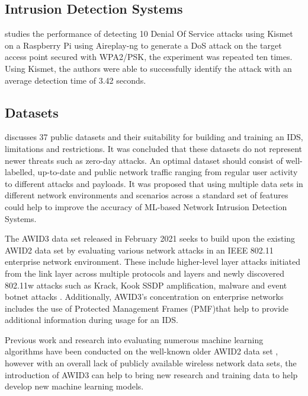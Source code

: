 \subsection{Intrusion Detection Systems}

\cite{10.4108/eai.27-11-2021.2315535} studies the performance of detecting 10 Denial Of Service attacks using Kismet on a Raspberry Pi using Aireplay-ng to generate a DoS attack on the target access point secured with WPA2/PSK, the experiment was repeated ten times. Using Kismet, the authors were able to successfully identify the attack with an average detection time of 3.42 seconds.

\subsection{Datasets}

\cite{9664737} discusses 37 public datasets and their suitability for building and training an IDS, limitations and restrictions. It was concluded that these datasets do not represent newer threats such as zero-day attacks. An optimal dataset should consist of well-labelled, up-to-date and public network traffic ranging from regular user activity to different attacks and payloads. It was proposed that using multiple data sets in different network environments and scenarios across a standard set of features could help to improve the accuracy of ML-based Network Intrusion Detection Systems.

\medskip

The AWID3 data set \parencite{9360747} released in February 2021 seeks to build upon the existing AWID2 data set by evaluating various network attacks in an IEEE 802.11 enterprise network environment. These include higher-level layer attacks initiated from the link layer across multiple protocols and layers and newly discovered 802.11w attacks such as Krack, Kook SSDP amplification, malware and event botnet attacks \parencite{kolias2015intrusion}. Additionally, AWID3's concentration on enterprise networks includes the use of Protected Management Frames (PMF)that help to provide additional information during usage for an IDS. 

Previous work and research into evaluating numerous machine learning algorithms have been conducted on the well-known older AWID2 data set \parencite{kolias2015intrusion}, however with an overall lack of publicly available wireless network data sets, the introduction of AWID3 can help to bring new research and training data to help develop new machine learning models.  

